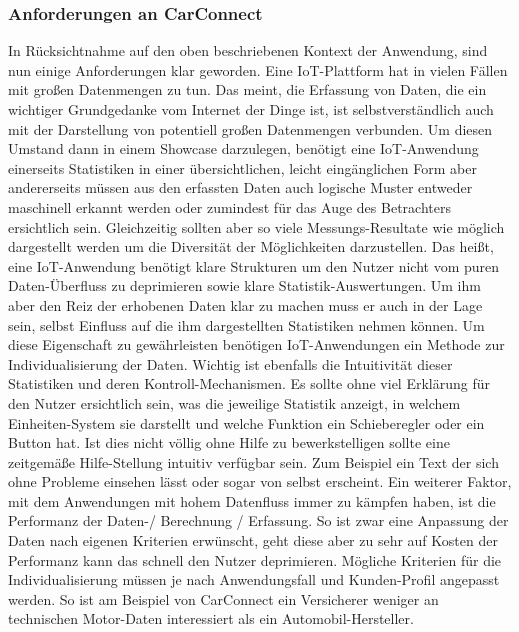 \documentclass[12pt,a4paper,oneside, 
liststotoc, 					%
bibtotoc,						%
titlepage, 						%
headsepline, 					%
BCOR6mm,						%
openany,							%
]{scrreprt}
\begin{document}
\subsubsection{Anforderungen an CarConnect}\label{context_dependencies}
In Rücksichtnahme auf den oben beschriebenen Kontext der Anwendung, sind nun einige Anforderungen klar geworden. 
Eine IoT-Plattform hat in vielen Fällen mit großen Datenmengen zu tun. Das meint, die Erfassung von Daten, die ein wichtiger Grundgedanke vom Internet der Dinge ist, ist selbstverständlich auch mit der Darstellung von potentiell großen Datenmengen verbunden. Um diesen Umstand dann in einem Showcase darzulegen, benötigt eine IoT-Anwendung einerseits Statistiken in einer übersichtlichen, leicht eingänglichen Form aber andererseits müssen aus den erfassten Daten auch logische Muster entweder maschinell erkannt werden oder zumindest für das Auge des Betrachters ersichtlich sein. Gleichzeitig sollten aber so viele Messungs-Resultate wie möglich dargestellt werden um die Diversität der Möglichkeiten darzustellen. Das heißt, eine IoT-Anwendung benötigt klare Strukturen um den Nutzer nicht vom puren Daten-Überfluss zu deprimieren sowie klare Statistik-Auswertungen. Um ihm aber den Reiz der erhobenen Daten klar zu machen muss er auch in der Lage sein, selbst Einfluss auf die ihm dargestellten Statistiken nehmen können.  Um diese Eigenschaft zu gewährleisten benötigen IoT-Anwendungen ein Methode zur Individualisierung der Daten. 
Wichtig ist ebenfalls die Intuitivität dieser Statistiken und deren Kontroll-Mechanismen. Es sollte ohne viel Erklärung für den Nutzer ersichtlich sein, was die jeweilige Statistik anzeigt, in welchem Einheiten-System sie darstellt und welche Funktion ein Schieberegler oder ein Button hat. Ist dies nicht völlig ohne Hilfe zu bewerkstelligen sollte eine zeitgemäße Hilfe-Stellung intuitiv verfügbar sein. Zum Beispiel ein Text der sich ohne Probleme einsehen lässt oder sogar von selbst erscheint. Ein weiterer Faktor, mit dem Anwendungen mit hohem Datenfluss immer zu kämpfen haben, ist die Performanz der Daten-/ Berechnung / Erfassung. So ist zwar eine Anpassung der Daten nach eigenen Kriterien erwünscht, geht diese aber zu sehr auf Kosten der Performanz kann das schnell den Nutzer deprimieren. Mögliche Kriterien für die Individualisierung müssen je nach Anwendungsfall und Kunden-Profil angepasst werden. So ist am Beispiel von CarConnect ein Versicherer weniger an technischen Motor-Daten interessiert als ein Automobil-Hersteller.
\end{document}
